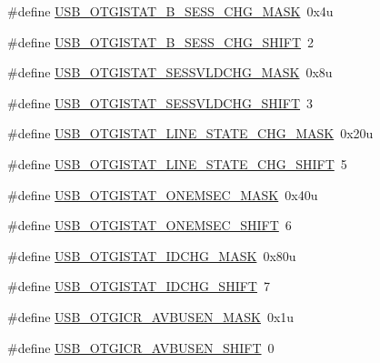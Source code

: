 \begin{DoxyCompactItemize}
\item 
\#define \hyperlink{group___u_s_b___register___masks_gafa204dddd4f034a5085b4599642689d7}{U\+S\+B\+\_\+\+O\+T\+G\+I\+S\+T\+A\+T\+\_\+\+B\+\_\+\+S\+E\+S\+S\+\_\+\+C\+H\+G\+\_\+\+M\+A\+SK}~0x4u
\item 
\#define \hyperlink{group___u_s_b___register___masks_gad18c5869e529e7edbe3251ee5e3ff33f}{U\+S\+B\+\_\+\+O\+T\+G\+I\+S\+T\+A\+T\+\_\+\+B\+\_\+\+S\+E\+S\+S\+\_\+\+C\+H\+G\+\_\+\+S\+H\+I\+FT}~2
\item 
\#define \hyperlink{group___u_s_b___register___masks_ga859962123dc28f346bafc99263efb811}{U\+S\+B\+\_\+\+O\+T\+G\+I\+S\+T\+A\+T\+\_\+\+S\+E\+S\+S\+V\+L\+D\+C\+H\+G\+\_\+\+M\+A\+SK}~0x8u
\item 
\#define \hyperlink{group___u_s_b___register___masks_gabcccd593607e1118c8283f20c69d7512}{U\+S\+B\+\_\+\+O\+T\+G\+I\+S\+T\+A\+T\+\_\+\+S\+E\+S\+S\+V\+L\+D\+C\+H\+G\+\_\+\+S\+H\+I\+FT}~3
\item 
\#define \hyperlink{group___u_s_b___register___masks_ga596dfbf3a2a0a6e6dcb1885ef11b4f8f}{U\+S\+B\+\_\+\+O\+T\+G\+I\+S\+T\+A\+T\+\_\+\+L\+I\+N\+E\+\_\+\+S\+T\+A\+T\+E\+\_\+\+C\+H\+G\+\_\+\+M\+A\+SK}~0x20u
\item 
\#define \hyperlink{group___u_s_b___register___masks_ga7cb2076a9bf32a49fdbc7efcfc5fb8bb}{U\+S\+B\+\_\+\+O\+T\+G\+I\+S\+T\+A\+T\+\_\+\+L\+I\+N\+E\+\_\+\+S\+T\+A\+T\+E\+\_\+\+C\+H\+G\+\_\+\+S\+H\+I\+FT}~5
\item 
\#define \hyperlink{group___u_s_b___register___masks_gaa59b13f2f60173eaf2844dd089a6b31a}{U\+S\+B\+\_\+\+O\+T\+G\+I\+S\+T\+A\+T\+\_\+\+O\+N\+E\+M\+S\+E\+C\+\_\+\+M\+A\+SK}~0x40u
\item 
\#define \hyperlink{group___u_s_b___register___masks_ga561173eac45ee89d7447416da7747ec2}{U\+S\+B\+\_\+\+O\+T\+G\+I\+S\+T\+A\+T\+\_\+\+O\+N\+E\+M\+S\+E\+C\+\_\+\+S\+H\+I\+FT}~6
\item 
\#define \hyperlink{group___u_s_b___register___masks_ga853101783769b0e8f1c68dc63ed5dbbc}{U\+S\+B\+\_\+\+O\+T\+G\+I\+S\+T\+A\+T\+\_\+\+I\+D\+C\+H\+G\+\_\+\+M\+A\+SK}~0x80u
\item 
\#define \hyperlink{group___u_s_b___register___masks_gac273f68643eb40324f598cb4a275b87b}{U\+S\+B\+\_\+\+O\+T\+G\+I\+S\+T\+A\+T\+\_\+\+I\+D\+C\+H\+G\+\_\+\+S\+H\+I\+FT}~7
\item 
\#define \hyperlink{group___u_s_b___register___masks_ga7754d512762167f81175b40ed5243050}{U\+S\+B\+\_\+\+O\+T\+G\+I\+C\+R\+\_\+\+A\+V\+B\+U\+S\+E\+N\+\_\+\+M\+A\+SK}~0x1u
\item 
\#define \hyperlink{group___u_s_b___register___masks_gac9ca8070fe9426a83bc59be69471edd3}{U\+S\+B\+\_\+\+O\+T\+G\+I\+C\+R\+\_\+\+A\+V\+B\+U\+S\+E\+N\+\_\+\+S\+H\+I\+FT}~0

\end{DoxyCompactItemize}
